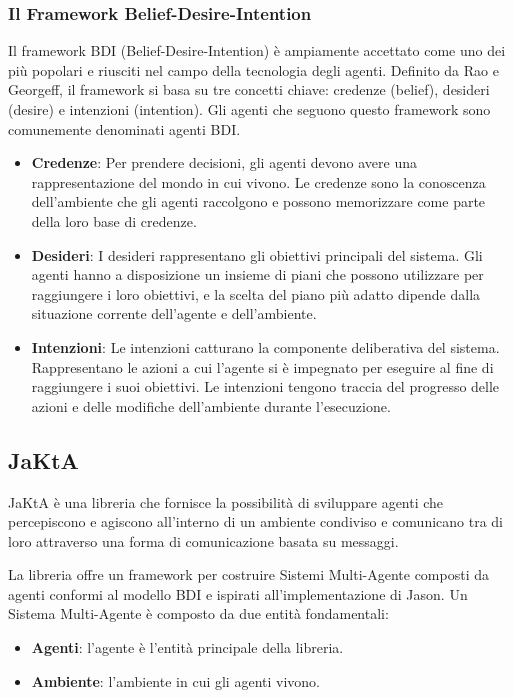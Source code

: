 \subsubsection{Il Framework Belief-Desire-Intention}
Il framework BDI (Belief-Desire-Intention) è ampiamente accettato come uno dei più popolari e riusciti nel campo della tecnologia degli agenti. Definito da Rao e Georgeff, il framework si basa su tre concetti chiave: credenze (belief), desideri (desire) e intenzioni (intention). Gli agenti che seguono questo framework sono comunemente denominati agenti BDI.

\begin{itemize}
    \item \textbf{Credenze}: Per prendere decisioni, gli agenti devono avere una rappresentazione del mondo in cui vivono. Le credenze sono la conoscenza dell'ambiente che gli agenti raccolgono e possono memorizzare come parte della loro base di credenze.
    \item \textbf{Desideri}: I desideri rappresentano gli obiettivi principali del sistema. Gli agenti hanno a disposizione un insieme di piani che possono utilizzare per raggiungere i loro obiettivi, e la scelta del piano più adatto dipende dalla situazione corrente dell'agente e dell'ambiente.
    \item \textbf{Intenzioni}: Le intenzioni catturano la componente deliberativa del sistema. Rappresentano le azioni a cui l'agente si è impegnato per eseguire al fine di raggiungere i suoi obiettivi. Le intenzioni tengono traccia del progresso delle azioni e delle modifiche dell'ambiente durante l'esecuzione.
\end{itemize}

\subsection{JaKtA}
JaKtA è una libreria che fornisce la possibilità di sviluppare agenti che percepiscono e agiscono all'interno di un ambiente condiviso e comunicano tra di loro attraverso una forma di comunicazione basata su messaggi.

La libreria offre un framework per costruire Sistemi Multi-Agente composti da agenti conformi al modello BDI e ispirati all'implementazione di Jason. Un Sistema Multi-Agente è composto da due entità fondamentali:

\begin{itemize}
    \item \textbf{Agenti}: l'agente è l'entità principale della libreria.
    \item \textbf{Ambiente}: l'ambiente in cui gli agenti vivono.
\end{itemize}

